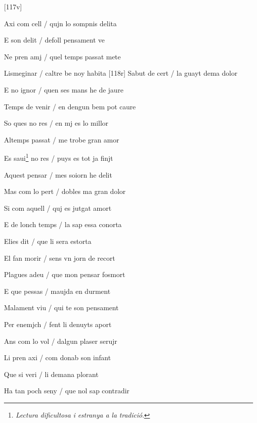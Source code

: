 




[117v]
\begin{estrofa}

 Axi com cell / qujn lo sompnis delita

 E son delit / defoll pensament ve

 Ne pren amj / quel temps passat mete

 Lismeginar / caltre be noy habita
[118r]
 Sabut de cert / la guayt dema dolor

 E no ignor / quen ses mans he de jaure

 Temps de venir / en dengun bem pot caure

 So ques no res / en mj es lo millor

\end{estrofa}



\begin{estrofa}

 Altemps passat / me trobe gran amor

 Es saui\footnote{\textit{Lectura dificultosa i estranya a la tradici\'{o}}.} no
res / puys es tot ja finjt

 Aquest pensar / mes soiorn he delit

 Mas com lo pert / dobles ma gran dolor

 Si com aquell / quj es jutgat amort

 E de lonch temps / la sap essa conorta

 Elies dit / que li sera estorta

 El fan morir / sens vn jorn de recort

\end{estrofa}



\begin{estrofa}

 Plagues adeu / que mon pensar fosmort

 E que pessas / maujda en durment

 Malament viu / qui te son pensament

 Per enemjch / fent li denuyts aport

 Ans com lo vol / dalgun plaser serujr

 Li pren axi / com donab son infant

 Que si veri / li demana plorant

 Ha tan poch seny / que nol sap contradir

\end{estrofa}



